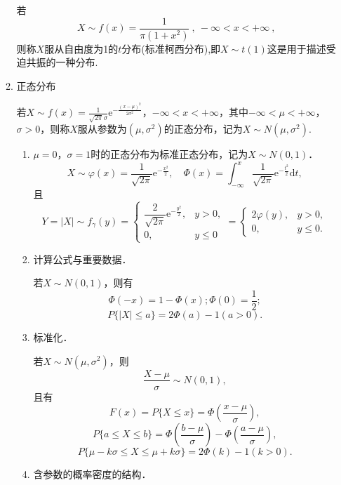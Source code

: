 \begin{enumerate}
\begin{enumerate}
                        若
                        $$X\sim f(x)=\frac{1}{\pi(1+x^{2})}\:,\:-\infty<x<+\infty\:,$$
                        则称$X$服从自由度为1的$t$分布(标准柯西分布),即$X\sim t(1)$这是用于描述受迫共振的一种分布.
                  \item 正态分布

                        若$X\sim f(x)=\frac{1}{\sqrt{2\pi}\sigma}\mathrm{e}^{-\frac{(x-\mu)^2}{2\sigma^2}}$，$-\infty<x<+\infty$，其中$-\infty<\mu<+\infty$，$\sigma>0$，则称$X$服从参数为$(\mu,\sigma^2)$的正态分布，记为$X\sim N(\mu,\sigma^2)$.
                        \begin{note}{}{}
                              \begin{enumerate}
                                    \item  $\mu=0$，$\sigma=1$时的正态分布为标准正态分布，记为$X\sim N(0,1)$．
                                          $$X\sim\varphi(x)=\frac{1}{\sqrt{2\pi}}\mathrm{e}^{-\frac{x^2}{2}}, \quad \Phi(x)=\int_{-\infty}^x\frac{1}{\sqrt{2\pi}}\mathrm{e}^{-\frac{t^2}{2}}\mathrm{d}t,$$
                                          且
                                          $$Y=\mid X\mid\sim f_{\gamma}(y)=\begin{cases}\dfrac{2}{\sqrt{2\pi}}\mathrm{e}^{-\frac{y^{2}}{2}},&y>0,\\0,&y\leqslant0\end{cases}=\begin{cases}2\varphi(y),&y>0,\\0,&y\leqslant0.\end{cases}$$
                                    \item 计算公式与重要数据．

                                          若$X\sim N(0,1)$，则有
                                          $$
                                                \Phi(-x)=1-\Phi(x); \Phi(0)=\frac{1}{2};$$
                                          $$P\{|X|\leqslant a\}=2\Phi(a)-1(a>0).$$

                                    \item 标准化．

                                          若$X\sim N(\mu,\sigma^2)$，则
                                          $$
                                                \frac{X-\mu}{\sigma}\sim N(0,1),$$
                                          且有
                                          $$F(x)=P\{X\leqslant x\}=\Phi\left(\frac{x-\mu}{\sigma}\right),$$
                                          $$
                                                P\{a\leqslant X\leqslant b\}=\Phi\left(\frac{b-\mu}{\sigma}\right)-\Phi\left(\frac{a-\mu}{\sigma}\right),$$
                                          $$P\{\mu-k\sigma\leqslant X\leqslant\mu+k\sigma\}=2\Phi(k)-1(k>0).$$
                                    \item 含参数的概率密度的结构．


\end{enumerate}
\end{note}
\end{enumerate}
\end{enumerate}
